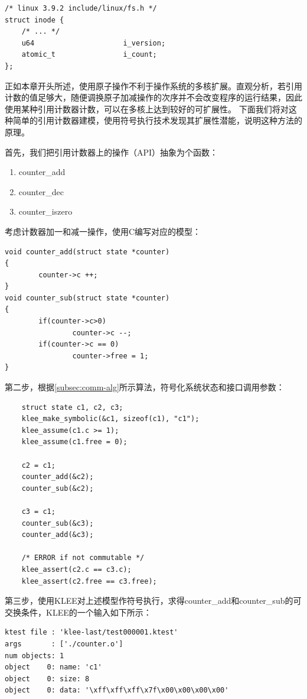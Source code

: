 \begin{Code}
	\centering
\begin{lstlisting}
/* linux 3.9.2 include/linux/fs.h */
struct inode {
	/* ... */
	u64                     i_version;
	atomic_t                i_count;
};
\end{lstlisting}
\end{Code}

正如本章开头所述，使用原子操作不利于操作系统的多核扩展。直观分析，若引用计数的值足够大，随便调换原子加减操作的次序并不会改变程序的运行结果，因此使用某种引用计数器计数，可以在多核上达到较好的可扩展性。
下面我们将对这种简单的引用计数器建模，使用符号执行技术发现其扩展性潜能，说明这种方法的原理。

首先，我们把引用计数器上的操作（API）抽象为个函数：
\begin{enumerate}
\item counter\_add
\item counter\_dec
\item counter\_iszero
\end{enumerate}

考虑计数器加一和减一操作，使用C编写对应的模型：

\begin{lstlisting}
void counter_add(struct state *counter)
{
        counter->c ++;
}
void counter_sub(struct state *counter)
{
        if(counter->c>0)
                counter->c --;
        if(counter->c == 0)
                counter->free = 1;
}
\end{lstlisting}

第二步，根据\ref{subsec:comm-alg}所示算法，符号化系统状态和接口调用参数：

\begin{lstlisting}
	struct state c1, c2, c3;
	klee_make_symbolic(&c1, sizeof(c1), "c1");
	klee_assume(c1.c >= 1);
	klee_assume(c1.free = 0);

	c2 = c1;
	counter_add(&c2);
	counter_sub(&c2);

	c3 = c1;
	counter_sub(&c3);
	counter_add(&c3);

	/* ERROR if not commutable */
	klee_assert(c2.c == c3.c);
	klee_assert(c2.free == c3.free);
\end{lstlisting}

第三步，使用KLEE对上述模型作符号执行，求得counter\_add和counter\_sub的可交换条件，KLEE的一个输入如下所示：

\begin{lstlisting}[caption=KLEE输出样例]
ktest file : 'klee-last/test000001.ktest'
args       : ['./counter.o']
num objects: 1
object    0: name: 'c1'
object    0: size: 8
object    0: data: '\xff\xff\xff\x7f\x00\x00\x00\x00'
\end{lstlisting}

